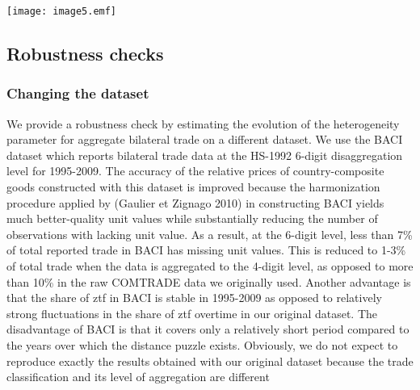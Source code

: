 \documentclass[12pt,twoside,a4paper,notitlepage]{article}
\begin{document}
{\texttt{[image: image5.emf]} 

\subsection{Robustness checks\label{mark-2.3.}}

\subsubsection{Changing the dataset\label{mark-2.3.1.}}


We provide a robustness check by estimating the evolution of the heterogeneity parameter for aggregate bilateral trade on a different dataset. We use the BACI dataset which reports bilateral trade data at the HS-1992 6-digit disaggregation level for 1995-2009. The accuracy of the relative prices of country-composite goods constructed with this dataset is improved because the harmonization procedure applied by (Gaulier et Zignago 2010) in constructing BACI yields much better-quality unit values while substantially reducing the number of observations with lacking unit value. As a result, at the 6-digit level, less than 7\% of total reported trade in BACI has missing unit values. This is reduced to 1-3\% of total trade when the data is aggregated to the 4-digit level, as opposed to more than 10\% in the raw COMTRADE data we originally used. Another advantage is that the share of ztf in BACI is stable in 1995-2009 as opposed to relatively strong fluctuations in the share of ztf overtime in our original dataset. The disadvantage of BACI is that it covers only a relatively short period compared to the years over which the distance puzzle exists. Obviously, we do not expect to reproduce exactly the results obtained with our original dataset because the trade classification and its level of aggregation are different

}
\end{document}
